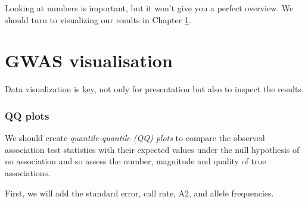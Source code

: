 \documentclass[
]{book}
\begin{document}
Looking at numbers is important, but it won't give you a perfect overview. We should turn to visualizing our results in Chapter \ref{gwas-visuals}.

\hypertarget{gwas-visuals}{%
\chapter{GWAS visualisation}\label{gwas-visuals}}

Data visualization is key, not only for presentation but also to inspect the results.

\hypertarget{qq-plots}{%
\subsection{QQ plots}\label{qq-plots}}

We should create \emph{quantile-quantile (QQ) plots} to compare the observed association test statistics with their expected values under the null hypothesis of no association and so assess the number, magnitude and quality of true associations.

First, we will add the standard error, call rate, A2, and allele frequencies.
\end{document}
